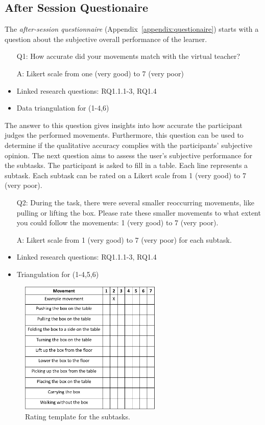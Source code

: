 \subsection{After Session Questionaire}
The \textit{after-session questionnaire} (Appendix~\ref{appendix:questionaire}) starts with a question about the subjective overall performance of the learner. 
\begin{itemize}
	\item[Q1:] How accurate did your movements match with the virtual teacher?
	\item[A:] Likert scale from one (very good) to 7 (very poor)
	\item Linked research questions: RQ1.1.1-3, RQ1.4
	\item Data triangulation for (1-4,6)
\end{itemize}
The answer to this question gives insights into how accurate the participant judges the performed movements. Furthermore, this question can be used to determine if the qualitative accuracy complies with the participants' subjective opinion. The next question aims to assess the user's subjective performance for the subtasks. The participant is asked to fill in a table. Each line represents a subtask. Each subtask can be rated on a Likert scale from 1 (very good) to 7 (very poor).
\begin{itemize}
	\item[Q2:] During the task, there were several smaller reoccurring movements, like pulling or lifting the box. Please rate these smaller movements to what extent you could follow the movements: 1 (very good) to 7 (very poor).
	\item[A:] Likert scale from 1 (very good) to 7 (very poor) for each subtask.
	\item Linked research questions: RQ1.1.1-3, RQ1.4
	\item Triangulation for (1-4,5,6)
\end{itemize}

\begin{figure}[H]
	\centering
	\includegraphics[width=0.6\textwidth]{figures/sub-task-rating.png}
	\caption[Rating template: subtasks]{Rating template for the subtasks.}
	\label{fig:subtaskrating}
\end{figure}

